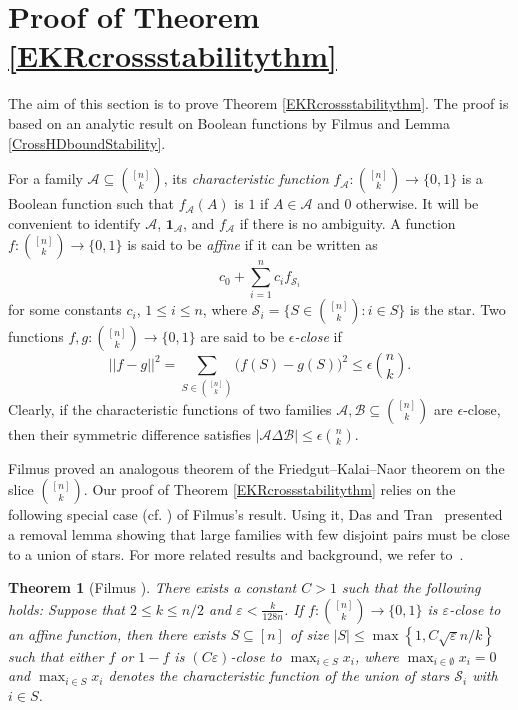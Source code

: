 \documentclass[10pt,a4paper]{amsart}
\numberwithin{equation}{section}
\newtheorem{theorem}{Theorem}[section]
\def\A{\mathcal{A}}
\def\B{\mathcal{B}}
\def\S{\mathcal{S}}
\def\1{\mathbf{1}}
\begin{document}
\section{Proof of Theorem \ref{EKRcrossstabilitythm}}

The aim of this section is to prove Theorem \ref{EKRcrossstabilitythm}.
The proof is based on an analytic result on Boolean functions by Filmus \cite{Filmus} and Lemma \ref{CrossHDboundStability}.

For a  family  $\A \subseteq \binom{[n]}{k}$, its {\em characteristic function}
$f_\A:\binom{[n]}{k}\to \{0,1\}$ is a Boolean function such that
$f_\A(A)$ is $1$ if $A\in\A$ and $0$ otherwise.
It will be convenient to identify $\A$, $\1_\A$, and $f_\A$ if there is no ambiguity.
A function $f :\binom{[n]}{k}\to \{0,1\}$ is said to be {\em affine}
if it can be written as %
$$c_0 +\sum_{i=1}^n c_i f_{\S_i}$$
for some constants $c_i$, $1\leq i \leq n$, where
$\S_i=\{S\in \binom{[n]}{k}: i\in S\}$ is the star.
Two functions $f,g:\binom{[n]}{k} \to \{0, 1\}$ are said to be
{\em $\epsilon$-close} if
$$||f-g||^2=\sum_{S \in \binom{[n]}{k}} \big(f(S)-g(S)\big)^2
\leq \epsilon \binom{n}{k}.$$
Clearly, if the characteristic functions of two families
$\A, \B\subseteq \binom{[n]}{k}$ are $\epsilon$-close, then their symmetric difference satisfies $|\A \Delta \B|\leq \epsilon \binom{n}{k}.$




Filmus \cite[Theorem 3.1]{Filmus} proved an analogous theorem of the Friedgut--Kalai--Naor theorem \cite{Friedgut} on the slice $\binom{[n]}{k}$.
Our proof of Theorem \ref{EKRcrossstabilitythm} relies on the following special case (cf. \cite[Theorem~6]{Das}) of Filmus's result.
Using it,
Das and Tran~\cite[Theorem 2]{Das} presented a removal lemma showing that large families with few disjoint pairs must be close to a union of stars.
For more related results and background, we refer to~\cite{Filmus,FilmusCPC}.


\begin{theorem}[Filmus \cite{Filmus}]\label{FNKthninkslice}
There exists a constant $C>1$ such that the following holds:
Suppose that $2\leq k\leq n/2$ and $\varepsilon<  \frac{k}{128n}$.
If $f:\binom{[n]}{k}\to \{0,1\}$ is $\varepsilon$-close to an affine function,
then there exists $S\subseteq [n]$ of size
$|S|\leq \max\left\{1, C \sqrt{\varepsilon}n/k \right\}$ such that either $f$ or $1-f$ is $(C\varepsilon)$-close to $\max_{i\in S} x_i$,
where $\max_{i\in \emptyset} x_i=0$ and $\max_{i\in S} x_i$ denotes the characteristic function of
the union of stars $\S_i$ with $i\in S$.
\end{theorem}
\end{document}
